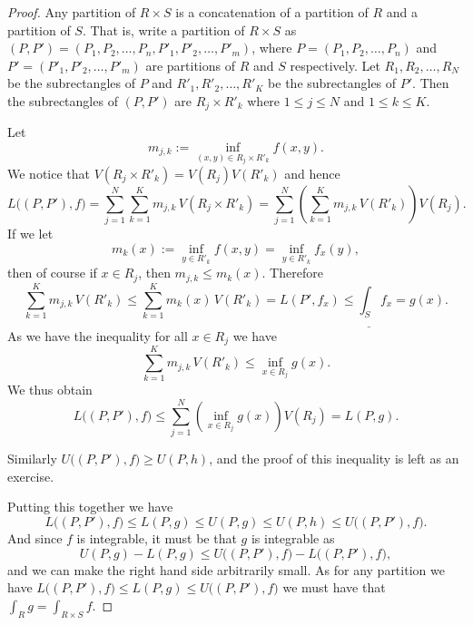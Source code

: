 \documentclass[12pt]{book}
\theoremstyle{plain}
\theoremstyle{remark}
\theoremstyle{definition}
\theoremstyle{exercise}
\theoremstyle{example}
\begin{document}
\begin{proof}
Any partition of $R \times S$ is a concatenation of a partition of $R$ and a
partition of $S$.  That is, write a partition of $R \times S$
as $(P,P') = (P_1,P_2,\ldots,P_n,P'_1,P'_2,\ldots,P'_m)$,
where
$P = (P_1,P_2,\ldots,P_n)$ and
$P' = (P'_1,P'_2,\ldots,P'_m)$ are partitions of $R$ and $S$ respectively.
Let
$R_1,R_2,\ldots,R_N$ be the subrectangles of $P$ and
$R'_1,R'_2,\ldots,R'_K$ be the subrectangles of $P'$.
Then the subrectangles of $(P,P')$ are
$R_j \times R'_k$ where $1 \leq j \leq N$ and $1 \leq k \leq K$.

Let
\begin{equation*}
m_{j,k} :=
\inf_{(x,y) \in R_j \times R'_k} f(x,y) .
\end{equation*}
We notice that
$V(R_j \times R'_k) = V(R_j)V(R'_k)$ and hence
\begin{equation*}
L\bigl((P,P'),f\bigr) =
\sum_{j=1}^N
\sum_{k=1}^K
m_{j,k} \, V(R_j \times R'_k)
=
\sum_{j=1}^N
\left(
\sum_{k=1}^K
m_{j,k} \, V(R'_k) \right) V(R_j) .
\end{equation*}
If we let
\begin{equation*}
m_k(x) := \inf_{y \in R'_k} f(x,y) = \inf_{y \in R'_k} f_x(y) ,
\end{equation*}
then of course if $x \in R_j$, then $m_{j,k} \leq m_k(x)$.  Therefore
\begin{equation*}
\sum_{k=1}^K
m_{j,k} \, V(R'_k)
\leq \sum_{k=1}^K m_k(x) \, V(R'_k) = L(P',f_x) \leq
\underline{\int_S} f_x = g(x) .
\end{equation*}
As we have the inequality for all $x \in R_j$ we have
\begin{equation*}
\sum_{k=1}^K
m_{j,k} \, V(R'_k)
\leq \inf_{x \in R_j} g(x) .
\end{equation*}
We thus obtain
\begin{equation*}
L\bigl((P,P'),f\bigr) 
\leq
\sum_{j=1}^N
\left(
\inf_{x \in R_j} g(x)
\right) V(R_j) = L(P,g) .
\end{equation*}

Similarly $U\bigl((P,P'),f) \geq U(P,h)$, and the proof of this inequality is
left as an exercise.

Putting this together we have
\begin{equation*}
L\bigl((P,P'),f\bigr)
\leq
L(P,g) \leq
U(P,g) \leq
U(P,h) \leq
U\bigl((P,P'),f\bigr) .
\end{equation*}
And since $f$ is integrable, it must be that $g$ is integrable as
\begin{equation*}
U(P,g) - L(P,g)
\leq
U\bigl((P,P'),f\bigr) -
L\bigl((P,P'),f\bigr) ,
\end{equation*}
and we can make the right hand side arbitrarily small.
As for any partition we have 
$L\bigl((P,P'),f\bigr) \leq L(P,g) \leq U\bigl((P,P'),f\bigr)$ we must have
that $\int_R g = \int_{R \times S} f$.


\end{proof}
\end{document}
